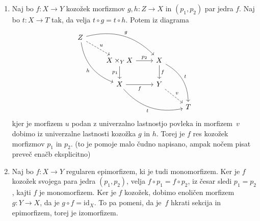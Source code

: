 \documentclass[../kategoricna_logika.tex]{subfiles}
\begin{document}
\begin{dokaz}
\begin{enumerate}[label=(\roman*)]
  \item  %
    Naj bo $f : X \to Y$ kozožek morfizmov $g,h : Z \to X$ in $(p_1, p_2)$ par jedra $f$.
    Naj bo $t : X \to T$ tak, da velja $t \circ g = t \circ h$. Potem iz diagrama
    \begin{equation*}
    \begin{tikzcd}[row sep=normal, column sep=normal]
      Z \ar[ddr, bend right, "h"'] \ar[dr, dashed, "u"] \ar[drr, bend left, "g"] & & & \\
      & X \times_Y X \ar[d, "p_1"'] \ar[r, "p_2"] & X \ar[d, "f"] \ar[ddr, bend left, "t"] & \\
      & X \ar[r, "f"'] \ar[drr, bend right, "t"'] & Y \ar[dr, dashed, "v"] & \\
      & & & T
    \end{tikzcd}
    \end{equation*}
    kjer je morfizem $u$ podan z univerzalno lastnostjo povleka in morfizem~$v$
    dobimo iz univerzalne lastnosti kozožka $g$ in $h$.
    Torej je $f$ res kozožek morfizmov $p_1$ in $p_2$.
    (to je pomoje malo čudno napisano, ampak nočem pisat preveč enačb eksplicitno)

  \item %
    Naj bo $f : X \to Y$ regularen epimorfizem, ki je tudi monomorfizem.
    Ker je $f$ kozožek svojega para jedra $(p_1, p_2)$, velja $f \circ p_1 = f \circ p_2$,
    iz česar sledi $p_1 = p_2$, kajti $f$ je monomorfizem.
    Ker je $f$ kozožek, dobimo enoličen morfizem $g : Y \to X$, da je $g \circ f = \mathrm{id}_X$.
    To pa pomeni, da je~$f$ hkrati sekcija in epimorfizem, torej je izomorfizem.


\end{enumerate}
\end{dokaz}
\end{document}
